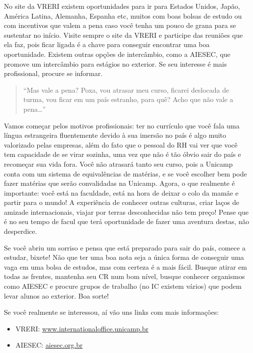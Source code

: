 No site da VRERI existem oportunidades para ir para Estados Unidos, Japão,
América Latina, Alemanha, Espanha etc, muitos com boas bolsas de estudo ou com
incentivos que valem a pena caso você tenha um pouco de grana para se sustentar
no início. Visite sempre o site da VRERI e participe das reuniões que ela faz,
pois ficar ligada é a chave para conseguir encontrar uma boa oportunidade.
Existem outras opções de intercâmbio, como a AIESEC, que promove um intercâmbio
para estágios no exterior. Se seu interesse é mais profissional, procure se
informar.

\begin{quote}
``Mas vale a pena? Poxa, vou atrasar meu curso, ficarei deslocada de turma, vou
ficar em um país estranho, para quê? Acho que não vale a pena{\dots}''
\end{quote}

Vamos começar pelos motivos profissionais: ter no currículo que você fala uma
língua estrangeira fluentemente devido à sua imersão no país é algo muito
valorizado pelas empresas, além do fato que o pessoal do RH vai ver que você
tem capacidade de se virar sozinha, uma vez que não é tão óbvio sair do país e
recomeçar sua vida fora. Você não atrasará tanto seu curso, pois a Unicamp
conta com um sistema de equivalências de matérias, e se você escolher bem pode
fazer matérias que serão convalidadas na Unicamp. Agora, o que realmente é
importante: você está na faculdade, está na hora de deixar o colo da mamãe e
partir para o mundo! A experiência de conhecer outras culturas, criar laços de
amizade internacionais, viajar por terras desconhecidas não tem preço! Pense
que é no seu tempo de facul que terá oportunidade de fazer uma aventura destas,
não desperdice.

Se você abriu um sorriso e pensa que está preparado para sair do país, comece a
estudar, bixete! Não que ter uma boa nota seja a única forma de conseguir uma
vaga em uma bolsa de estudos, mas com certeza é a mais fácil. Busque atirar em
todas as frentes, mantenha seu CR num bom nível, busque conhecer organismos
como AIESEC e procure grupos de trabalho (no IC existem vários) que podem levar
alunos ao exterior. Boa sorte!

Se você realmente se interessou, aí vão uns links com mais informações:

\begin{itemize}
    \item  VRERI: \url{www.internationaloffice.unicamp.br}
    \item  AIESEC: \url{aiesec.org.br}
\end{itemize}

